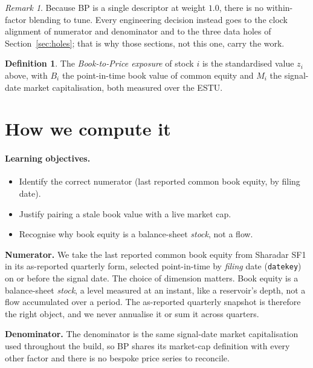 \documentclass[11pt]{article}
\theoremstyle{definition}
\newtheorem{definition}{Definition}[section]
\theoremstyle{plain}
\theoremstyle{remark}
\newtheorem*{remark}{Remark}
\begin{document}
\begin{remark}
Because BP is a single descriptor at weight $1.0$, there is no within-factor blending to tune. Every engineering decision instead goes to the clock alignment of numerator and denominator and to the three data holes of Section~\ref{sec:holes}; that is why those sections, not this one, carry the work.
\end{remark}

\begin{definition}
The \emph{Book-to-Price exposure} of stock $i$ is the standardised value $z_i$ above, with $B_i$ the point-in-time book value of common equity and $M_i$ the signal-date market capitalisation, both measured over the ESTU.
\end{definition}

\section{How we compute it}\label{sec:compute}

\paragraph{Learning objectives.}
\begin{itemize}[leftmargin=1.4em,nosep]
  \item Identify the correct numerator (last reported common book equity, by filing date).
  \item Justify pairing a stale book value with a live market cap.
  \item Recognise why book equity is a balance-sheet \emph{stock}, not a flow.
\end{itemize}

\textbf{Numerator.} We take the last reported common book equity from Sharadar SF1 in its as-reported quarterly form, selected point-in-time by \emph{filing} date (\texttt{datekey}) on or before the signal date. The choice of dimension matters. Book equity is a balance-sheet \emph{stock}, a level measured at an instant, like a reservoir's depth, not a flow accumulated over a period. The as-reported quarterly snapshot is therefore the right object, and we never annualise it or sum it across quarters.

\textbf{Denominator.} The denominator is the same signal-date market capitalisation used throughout the build, so BP shares its market-cap definition with every other factor and there is no bespoke price series to reconcile.
\end{document}

